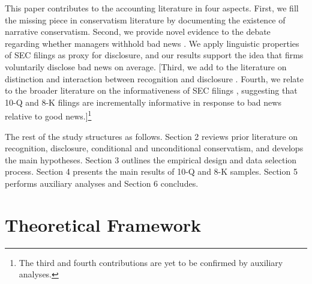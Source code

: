 \documentclass[a4paper]{article}
\begin{document}
\begin{spacing}{2}
This paper contributes to the accounting literature in four aspects. First, we fill the missing piece in conservatism literature by documenting the existence of narrative conservatism. Second, we provide novel evidence to the debate regarding whether managers withhold bad news \citep{baoManagersDiscloseWithhold2019, kothariManagersWithholdBad2009, skinnerWhyFirmsVoluntarily1994, skinnerEarningsDisclosuresStockholder1997}. We apply linguistic properties of SEC filings as proxy for disclosure, and our results support the idea that firms voluntarily disclose bad news on average. [Third, we add to the literature on distinction and interaction between recognition and disclosure \citep*{schipperRequiredDisclosuresFinancial2007, barthMarketEffectsRecognition2003, aboodyRecognitionDisclosureOil1996}. Fourth, we relate to the broader literature on the informativeness of SEC filings \citep*{lermanNewForm8K2010, alfordExtensionsViolationsStatutory1994, liAnnualReportReadability2008, liInformationContentForwardLooking2010}, suggesting that 10-Q and 8-K filings are incrementally informative in response to bad news relative to good news.]\footnote{ The third and fourth contributions are yet to be confirmed by auxiliary analyses.}

The rest of the study structures as follows. Section 2 reviews prior literature on recognition, disclosure, conditional and unconditional conservatism, and develops the main hypotheses. Section 3 outlines the empirical design and data selection process. Section 4 presents the main results of 10-Q and 8-K samples. Section 5 performs auxiliary analyses and Section 6 concludes.

\section{Theoretical Framework}

\end{spacing}
\end{document}
